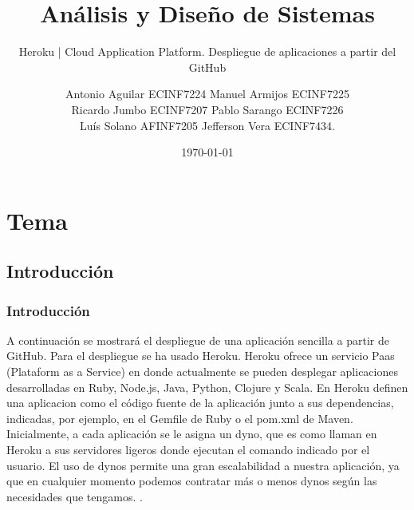 \documentclass{beamer}
\title{Análisis y Diseño de Sistemas}
\subtitle{Heroku | Cloud Application Platform.  Despliegue de aplicaciones a partir del GitHub}
\author{
Antonio Aguilar ECINF7224
Manuel Armijos ECINF7225 \\
Ricardo Jumbo ECINF7207 
Pablo Sarango ECINF7226 \\
Luís Solano AFINF7205
Jefferson Vera ECINF7434.
}
\date{\today}
\institute{Ingeniería en Sistemas\\ pgsarangou@unl.edu.ec}
\begin{document}
\justifying
	
	\begin{frame}[plain,t]
		\titlepage
	\end{frame}

	\section{Tema}

	\subsection{Introducción}
		\begin{frame}
			\frametitle{Introducción}
			A continuación se mostrará el despliegue de una aplicación sencilla a partir de GitHub. Para el despliegue se ha usado Heroku. Heroku ofrece un servicio Paas (Plataform as a Service) en donde actualmente se pueden desplegar aplicaciones desarrolladas en Ruby, Node.js, Java, Python, Clojure y Scala. En Heroku definen una aplicacion como el código fuente de la aplicación junto a sus dependencias, indicadas, por ejemplo, en el
			Gemfile de Ruby o el pom.xml de Maven. Inicialmente, a cada aplicación se le asigna un dyno, que es como llaman en Heroku a sus servidores ligeros donde ejecutan el comando indicado por el usuario. El uso de dynos permite una gran escalabilidad a nuestra aplicación, ya que en cualquier momento podemos contratar más o menos dynos según las
			necesidades que tengamos. \cite{lopez-pellicer_github_2015}.
\end{frame}
\end{document}
